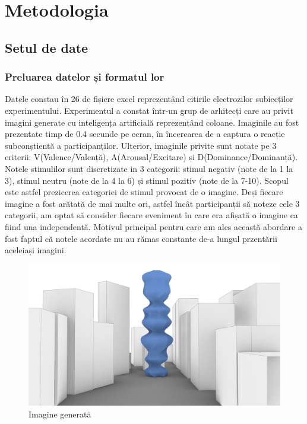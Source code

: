\def\totalEpoci{5598}
\def\totalEpociTestare{0}
\def\totalEpociValentaPozitiva{1014}
\def\totalEpociValentaNegativa{942}
\def\totalEpociValentaNeutra{3642}
\def\crestereAcurateteAutoReject{10}
\def\nrParticipantiAntrenare{21}
\def\nrParticipantiValidare{2}
\def\nrParticipantiTestare{3}

\chapter{Metodologia}

\section{Setul de date}
\subsection{Preluarea datelor și formatul lor}
Datele constau în 26 de fișiere excel reprezentând citirile electrozilor subiecților experimentului.
Experimentul a constat într-un grup de arhitecți care au privit imagini generate cu inteligența artificială reprezentând coloane. Imaginile au fost prezentate timp de 0.4 secunde pe ecran, în încercarea de a captura o reacție subconștientă a participanților.
Ulterior, imaginile  privite sunt notate pe 3 criterii: V(Valence/Valență), A(Arousal/Excitare) și D(Dominance/Dominanță). 
Notele stimulilor sunt discretizate in 3 categorii: stimul negativ (note de la 1 la 3), stimul neutru (note de la 4 la 6) și stimul pozitiv (note de la 7-10). 
Scopul este astfel prezicerea categoriei de stimul provocat de o imagine. Deși fiecare imagine a fost arătată de mai multe ori, astfel încât participanții să noteze cele 3 categorii, am optat să consider fiecare eveniment în care era afișată o imagine ca fiind una independentă. Motivul principal pentru care am ales această abordare a fost faptul că notele acordate nu au rămas constante de-a lungul przentării aceleiași imagini.

\setlength{\abovecaptionskip}{0pt}
\setlength{\belowcaptionskip}{0pt}
\begin{figure}[h]
    \centering
    \includegraphics[width=0.5\linewidth]{stimul_image.png}
    \caption{Imagine generată}
    \label{fig:enter-label}
\end{figure}


